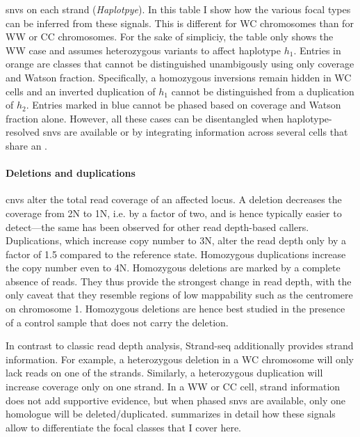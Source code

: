 \begin{table}[t]
{    \acp{snv} on each strand (\emph{Haplotpye}). In this table I show how the
    various focal \sv types can be inferred from these signals. This is different
    for WC chromosomes than for WW or CC chromosomes. For the sake of simpliciy,
    the table only shows the WW case and assumes heterozygous variants to affect
    haplotype $h_1$. Entries in orange are \sv classes that cannot be
    distinguished unambigously using only coverage and Watson fraction.
    Specifically, a homozygous inversions remain hidden in WC cells and an
    inverted duplication of $h_1$ cannot be distinguished from a duplication of
    $h_2$. Entries marked in blue cannot be phased based on coverage and Watson
    fraction alone. However, all these cases can be disentangled when
    haplotype-resolved \acp{snv} are available or by integrating information
    across several cells that share an \sv.}
\end{table}

\paragraph{Deletions and duplications}
\Acp{cnv} alter the total read coverage of an affected locus. A deletion
decreases the coverage from 2N to 1N, i.e. by a factor of two, and is hence
typically easier to detect---the same has been observed for other read
depth-based \sv callers. Duplications, which increase copy number to 3N, alter
the read depth only by a factor of 1.5 compared to the reference state.
Homozygous duplications increase the copy number even to 4N. Homozygous
deletions are marked by a complete absence of reads. They thus provide the
strongest change in read depth, with the only caveat that they resemble regions
of low mappability such as the centromere on chromosome 1. Homozygous deletions
are hence best studied in the presence of a control sample that does not carry
the deletion.

In contrast to classic read depth analysis, Strand-seq additionally provides
strand information. For example, a heterozygous deletion in a WC chromosome will
only lack reads on one of the strands. Similarly, a heterozygous duplication
will increase coverage only on one strand. In a WW or CC cell, strand
information does not add supportive evidence, but when phased \acp{snv} are
available, only one homologue will be deleted/duplicated.
 summarizes in detail how these signals
allow to differentiate the focal \sv classes that I cover here.






